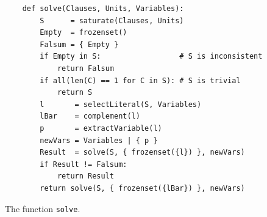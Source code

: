 \begin{figure}[!ht]
  \centering
\begin{verbatim}
    def solve(Clauses, Units, Variables):
        S      = saturate(Clauses, Units)
        Empty  = frozenset()
        Falsum = { Empty }
        if Empty in S:                  # S is inconsistent
            return Falsum
        if all(len(C) == 1 for C in S): # S is trivial
            return S
        l       = selectLiteral(S, Variables)
        lBar    = complement(l)
        p       = extractVariable(l)
        newVars = Variables | { p }
        Result  = solve(S, { frozenset({l}) }, newVars)
        if Result != Falsum:
            return Result
        return solve(S, { frozenset({lBar}) }, newVars)
\end{verbatim}
\vspace*{-0.3cm}
  \caption{The function \texttt{solve}.}
  \label{fig:solve}
\end{figure}
